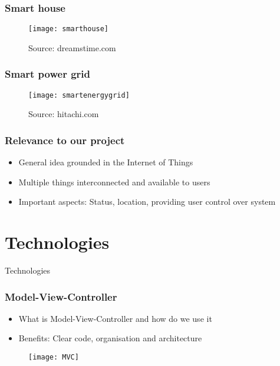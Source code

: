 \begin{frame}
\frametitle{Smart house}
\begin{center}
\begin{figure}
\texttt{[image: smarthouse]}
\caption{Source: dreamstime.com}
\end{figure}
\end{center}
\end{frame}

\begin{frame}
\frametitle{Smart power grid}
\begin{center}
\begin{figure}
\texttt{[image: smartenergygrid]}
\caption{Source: hitachi.com}
\end{figure}
\end{center}
\end{frame}

\begin{frame}
\frametitle{Relevance to our project}
\begin{itemize}
\item General idea grounded in the Internet of Things
\item Multiple things interconnected and available to users
\item Important aspects: Status, location, providing user control over system
\end{itemize}
\end{frame}

\section{Technologies}
\begin{frame}
\begin{center}
\Huge Technologies
\end{center}

\end{frame}
\begin{frame}

\frametitle{Model-View-Controller}
\begin{itemize}
\item What is Model-View-Controller and how do we use it
\item Benefits: Clear code, organisation and architecture
\end{itemize}
\begin{figure}
\centering
\texttt{[image: MVC]}
\end{figure}
\end{frame}

